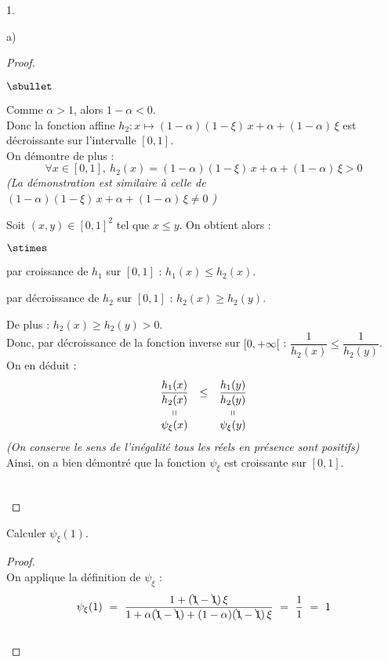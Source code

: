 \documentclass[11pt]{article}%
\begin{document}
\begin{noliste}{1.}
\begin{noliste}{a)}
\begin{proof}
\begin{remark}
\begin{noliste}{$\sbullet$}
	  \item Comme $\alpha >1$, alors $1-\alpha <0$.\\
	  Donc la fonction affine $h_2 : x \mapsto (1-\alpha)(1-\xi)
	  \, x + \alpha + (1-\alpha) \, \xi$ est décroissante sur 
	  l'intervalle $[0,1]$.\\
	  On démontre de plus : 
	  \[
	    \forall x \in [0,1], \ h_2(x) =
	    (1-\alpha)(1-\xi) \, x + \alpha + (1-\alpha) \, \xi
	    >0
	  \]
	  {\it (La démonstration est similaire à celle de \og 
	  $(1-\alpha)(1-\xi) \, x + \alpha + (1-\alpha) \, \xi \neq 
	  0$ \fg{})}
	  
	  \item Soit $(x,y) \in [0,1]^2$ tel que $x \leq y$. On obtient
	  alors :
	  \begin{noliste}{$\stimes$}
	    \item par croissance de $h_1$ sur $[0,1]$ :
	    $h_1(x) \leq h_2(x)$.
	    
	    \item par décroissance de $h_2$ sur $[0,1]$ : 
	    $h_2(x) \geq h_2(y)$.
	  \end{noliste}
	  De plus : $h_2(x) \geq h_2(y) >0$.\\
	  Donc, par décroissance de la fonction inverse sur 
	  $[0,+\infty[$ : $\dfrac{1}{h_2(x)} \leq 
	  \dfrac{1}{h_2(y)}$.\\[.1cm]
	  On en déduit :
	  \[
	    \begin{array}{ccc}
	      \dfrac{h_1(x)}{h_2(x)} & \leq & \dfrac{h_1(y)}{h_2(y)}
	      \\
	      \shortparallel & & \shortparallel
	      \\
	      \psi_\xi(x) & & \psi_\xi(y)
	    \end{array}
	  \]
	  {\it (On conserve le sens de l'inégalité tous les réels 
	  en présence sont positifs)}\\
	  Ainsi, on a bien démontré que la fonction $\psi_\xi$ est 
	  croissante sur $[0,1]$.
        \end{noliste}
      \end{remark}~\\[-1.4cm]
    \end{proof}

    
    \item Calculer $\psi_\xi(1)$.
    
    \begin{proof}~\\
      On applique la définition de $\psi_\xi$ :
      \[
        \psi_\xi(1) \ = \ \dfrac{1+(\bcancel{1} - \bcancel{1}) \, \xi}
        {1+ \alpha(\bcancel{1}-\bcancel{1}) + (1-\alpha)
        (\bcancel{1}-\bcancel{1}) \, \xi} \ = \ \dfrac{1}{1} \ = \ 1
      \]
      ~\\[-1cm]
    \end{proof}


\end{noliste}
\end{noliste}
\end{document}
